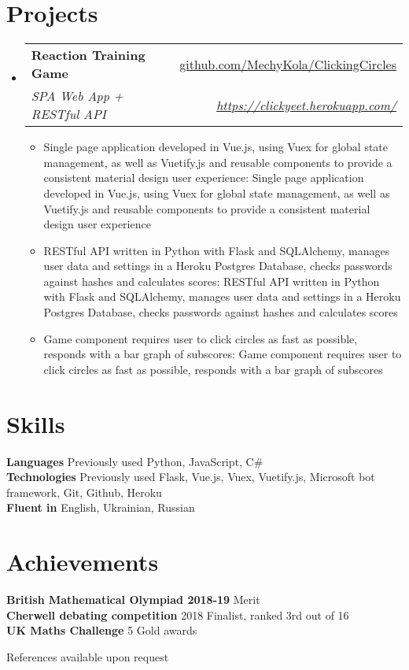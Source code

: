 \documentclass[a4paper,11pt]{article}
\makeatletter
\def \ifempty#1{\def\temp{#1} \ifx\temp\empty }
\newcommand{\resumeItem}[2]{
  \item\small{
  	\ifempty{#1}#2\else\textbf{#1}{: #2 \vspace{-2pt}}\fi
  }
}
\newcommand{\resumeSubheading}[4]{
  \vspace{-1pt}\item
    \begin{tabular*}{0.97\textwidth}{l@{\extracolsep{\fill}}r}
      \textbf{#1} & #2 \\
      \textit{\small#3} & \textit{\small #4} \\
    \end{tabular*}\vspace{-5pt}
}
\newcommand{\resumeSubHeadingListStart}{\begin{itemize}[leftmargin=*]}
\newcommand{\resumeSubHeadingListEnd}{\end{itemize}}
\newcommand{\resumeItemListStart}{\begin{itemize}}
\newcommand{\resumeItemListEnd}{\end{itemize}\vspace{-5pt}}
\makeatother
\begin{document}
\section{Projects}
  \resumeSubHeadingListStart
    \resumeSubheading
      {Reaction Training Game}{\href{https://github.com/MechyKola/ClickingCircles}
      {github.com/MechyKola/ClickingCircles}}
      {SPA Web App + RESTful API}{\href{https://clickyeet.herokuapp.com/}
      {https://clickyeet.herokuapp.com/}}
      \resumeItemListStart
        \resumeItem{}
          {Single page application developed in Vue.js, using Vuex for global state management,
          as well as Vuetify.js and reusable components to provide a consistent material design
          user experience}
        \resumeItem{}
          {RESTful API written in Python with Flask and SQLAlchemy, manages user data and 
          settings in a Heroku Postgres Database, checks passwords against 
          hashes and calculates scores}
        \resumeItem{}
          {Game component requires user to click circles as fast as possible, responds with
          a bar graph of subscores}
      \resumeItemListEnd
  \resumeSubHeadingListEnd


\section{Skills}
  \textbf{Languages}{ Previously used Python, JavaScript, C\#} \\
  \textbf{Technologies}{ Previously used Flask, 
  Vue.js, Vuex, Vuetify.js, Microsoft bot framework, Git, Github, Heroku} \\
  \textbf{Fluent in}{ English, Ukrainian, Russian} \\


\section{Achievements}
  \textbf{British Mathematical Olympiad 2018-19}{ Merit} \\
  \textbf{Cherwell debating competition}{ 2018 Finalist, ranked 3rd out of 16} \\
  \textbf{UK Maths Challenge}{ 5 Gold  awards} \\
  
  
\bigskip
\centerline{References available upon request}
\end{document}
